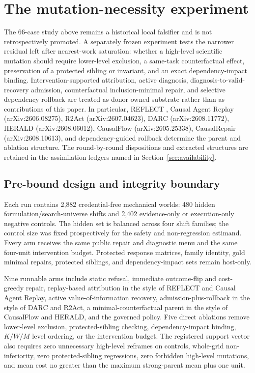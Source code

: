 \section{The mutation-necessity experiment}
\label{sec:necessity}

The 66-case study above remains a historical local falsifier and is not
retrospectively promoted. A separately frozen experiment tests the narrower
residual left after nearest-work saturation: whether a high-level scientific
mutation should require lower-level exclusion, a same-task counterfactual
effect, preservation of a protected sibling or invariant, and an exact
dependency-impact binding. Intervention-supported attribution, active diagnosis,
diagnosis-to-valid-recovery admission, counterfactual inclusion-minimal repair,
and selective dependency rollback are treated as donor-owned substrate rather
than as contributions of this paper. In particular, REFLECT \cite{reflect2026},
Causal Agent Replay (arXiv:2606.08275), R2Act (arXiv:2607.04623), DARC
(arXiv:2608.11772), HERALD (arXiv:2608.06012), CausalFlow (arXiv:2605.25338),
CausalRepair (arXiv:2608.10613), and dependency-guided rollback
\cite{dependencyrollback2026} determine the parent and ablation structure. The
round-by-round dispositions and extracted structures are retained in the
assimilation ledgers named in Section~\ref{sec:availability}.

\subsection{Pre-bound design and integrity boundary}

Each run contains 2,882 credential-free mechanical worlds: 480 hidden
formulation/search-universe shifts and 2,402 evidence-only or execution-only
negative controls. The hidden set is balanced across four shift families; the
control size was fixed prospectively for the safety and non-regression estimand.
Every arm receives the same public repair and diagnostic menu and the same
four-unit intervention budget. Protected response matrices, family identity,
gold minimal repairs, protected siblings, and dependency-impact sets remain
host-only.

Nine runnable arms include static refusal, immediate outcome-flip and
cost-greedy repair, replay-based attribution in the style of REFLECT and Causal
Agent Replay, active value-of-information recovery, admission-plus-rollback in
the style of DARC and R2Act, a minimal-counterfactual parent in the style of
CausalFlow and HERALD, and the governed policy. Five direct ablations remove
lower-level exclusion, protected-sibling checking, dependency-impact binding,
$K/W/M$ level ordering, or the intervention budget. The registered support
vector also requires zero unnecessary high-level reframes on controls,
whole-grid non-inferiority, zero protected-sibling regressions, zero forbidden
high-level mutations, and mean cost no greater than the maximum strong-parent
mean plus one unit.

